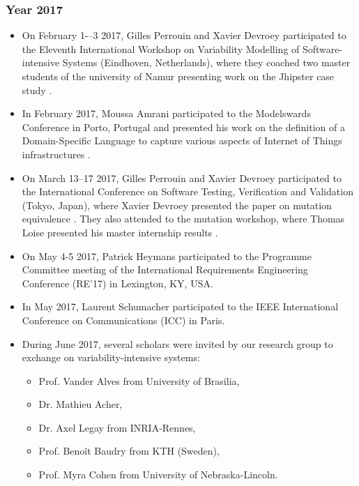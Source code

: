 \subsubsection{Year 2017}

\begin{itemize}
	\item On February 1-–3 2017, Gilles Perrouin and Xavier Devroey participated to the Eleventh International Workshop on Variability Modelling of Software-intensive Systems (Eindhoven, Netherlands), where they coached two master students of the university of Namur presenting work on the Jhipster case study \cite{Halin17}.
    
        \item In February 2017, Moussa Amrani participated to the Modelswards Conference in Porto, Portugal and presented his work on the definition of a Domain-Specific Language to capture various aspects of Internet of Things infrastructures \cite{Amrani-Gilson-Debieche-Englebert:2017}.
    
	\item On March 13--17 2017, Gilles Perrouin and Xavier Devroey participated to the International Conference on Software Testing, Verification and Validation (Tokyo, Japan), where Xavier Devroey presented the paper on mutation equivalence \cite{DBLP:conf/icst/DevroeyPPLSH17}. They also attended to the mutation workshop, where Thomas Loise presented his master internship results \cite{DBLP:conf/icst/LoiseDPPH17}.
    
    \item On May 4-5 2017, Patrick Heymans participated to the Programme Committee meeting of the International Requirements Engineering Conference (RE'17) in Lexington, KY, USA.
    
    \item In May 2017, Laurent Schumacher participated to the IEEE International Conference on Communications (ICC) in Paris.
   
    \item During June 2017, several scholars were invited by our research group to exchange on variability-intensive systems:
    \begin{itemize}
    \item Prof. Vander Alves from University of Brasilia,
    \item Dr. Mathieu Acher,
    \item Dr. Axel Legay from INRIA-Rennes,
    \item Prof. Benoît Baudry from KTH (Sweden),
    \item Prof. Myra Cohen from University of Nebraska-Lincoln.
	\end{itemize}
   

\end{itemize}
